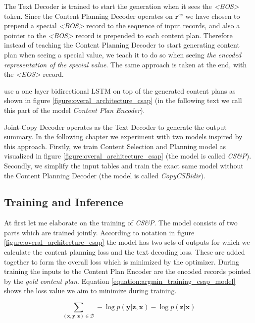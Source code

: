 The Text Decoder is trained to start the generation when it sees the \emph{\textless BOS\textgreater} token. Since the Content Planning Decoder operates on $\boldsymbol{r}^{cs}$ we have chosen to prepend a special \emph{\textless BOS\textgreater} record to the sequence of input records, and also a pointer to the \emph{\textless BOS\textgreater} record is prepended to each content plan. Therefore instead of teaching the Content Planning Decoder to start generating content plan when seeing a special value, we teach it to do so when seeing \emph{the encoded representation of the special value}. The same approach is taken at the end, with the \emph{\textless EOS\textgreater} record.

\citet{puduppully2019datatotext} use a one layer bidirectional LSTM on top of the generated content plans as shown in figure \ref{figure:overal_architecture_csap} (in the following text we call this part of the model \emph{Content Plan Encoder}).

Joint-Copy Decoder operates as the Text Decoder to generate the output summary. In the following chapter we experiment with two models inspired by this approach. Firstly, we train Content Selection and Planning model as visualized in figure \ref{figure:overal_architecture_csap} (the model is called \emph{CS\&P}). Secondly, we simplify the input tables and train the exact same model without the Content Planning Decoder (the model is called \emph{CopyCSBidir}).

\subsection{Training and Inference}

At first let me elaborate on the training of \emph{CS\&P}. The model consists of two parts which are trained jointly. According to notation in figure \ref{figure:overal_architecture_csap} the model has two sets of outputs for which we calculate the content planning loss and the text decoding loss. These are added together to form the overall loss which is minimized by the optimizer. During training the inputs to the Content Plan Encoder are the encoded records pointed by the \emph{gold content plan}. Equation \ref{equation:argmin_training_csap_model} shows the loss value we aim to minimize during training.

\begin{equation} \label{equation:argmin_training_csap_model}
    \sum_{(\boldsymbol{x}, \boldsymbol{y}, \boldsymbol{z}) \in \mathcal{D}} - \log{p(\boldsymbol{y}|\boldsymbol{z}, \boldsymbol{x})} - \log{p(\boldsymbol{z} | \boldsymbol{x})}
\end{equation}

